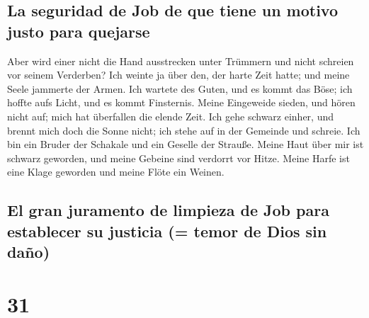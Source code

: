 \hypertarget{la-seguridad-de-job-de-que-tiene-un-motivo-justo-para-quejarse}{%
\subsection{La seguridad de Job de que tiene un motivo justo para
quejarse}\label{la-seguridad-de-job-de-que-tiene-un-motivo-justo-para-quejarse}}

 Aber wird einer nicht die Hand ausstrecken unter
Trümmern und nicht schreien vor seinem Verderben?  Ich
weinte ja über den, der harte Zeit hatte; und meine Seele jammerte der
Armen.  Ich wartete des Guten, und es kommt das Böse; ich
hoffte aufs Licht, und es kommt Finsternis.  Meine
Eingeweide sieden, und hören nicht auf; mich hat überfallen die elende
Zeit.  Ich gehe schwarz einher, und brennt mich doch die
Sonne nicht; ich stehe auf in der Gemeinde und schreie. 
Ich bin ein Bruder der Schakale und ein Geselle der Strauße.
 Meine Haut über mir ist schwarz geworden, und meine
Gebeine sind verdorrt vor Hitze.  Meine Harfe ist eine
Klage geworden und meine Flöte ein Weinen.

\hypertarget{el-gran-juramento-de-limpieza-de-job-para-establecer-su-justicia-temor-de-dios-sin-dauxf1o}{%
\subsection{El gran juramento de limpieza de Job para establecer su
justicia (= temor de Dios sin
daño)}\label{el-gran-juramento-de-limpieza-de-job-para-establecer-su-justicia-temor-de-dios-sin-dauxf1o}}

\hypertarget{section-30}{%
\section{31}\label{section-30}}

